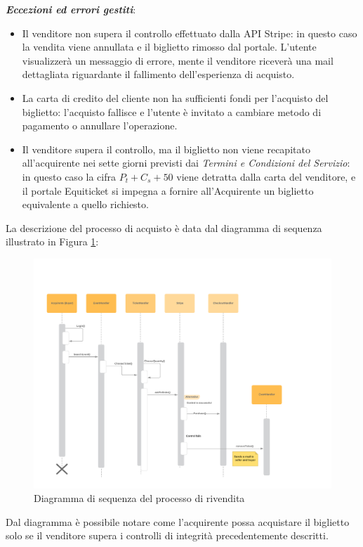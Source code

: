\textbf{\textit{Eccezioni ed errori gestiti}}: 
\begin{itemize}
\item Il venditore non supera il controllo effettuato dalla API Stripe: in questo caso la vendita viene annullata e il biglietto rimosso dal portale. L'utente visualizzerà un messaggio di errore, mente il venditore riceverà una mail dettagliata riguardante il fallimento dell'esperienza di acquisto. 
\item La carta di credito del cliente non ha sufficienti fondi per l'acquisto del biglietto: l'acquisto fallisce e l'utente è invitato a cambiare metodo di pagamento o annullare l'operazione. 
\item Il venditore supera il controllo, ma il biglietto non viene recapitato all'acquirente nei sette giorni previsti dai \textit{Termini e Condizioni del Servizio}: in questo caso la cifra $P_{t} + C_{s} + 50$ viene detratta dalla carta del venditore, e il portale Equiticket si impegna a fornire all'Acquirente un biglietto equivalente a quello richiesto. 
\end{itemize}
La descrizione del processo di acquisto è data dal diagramma di sequenza illustrato in Figura \ref{seqpur}:
\begin{figure}[htbp]
	\centering
	\includegraphics[width=\textwidth,height=\textheight, keepaspectratio, angle = 270]{chapter4/immagini/acquistoseq}
	\caption{Diagramma di sequenza del processo di rivendita}
	\label{seqpur}
\end{figure} 
Dal diagramma è possibile notare come l'acquirente possa acquistare il biglietto solo se il venditore supera i controlli di integrità precedentemente descritti. 
